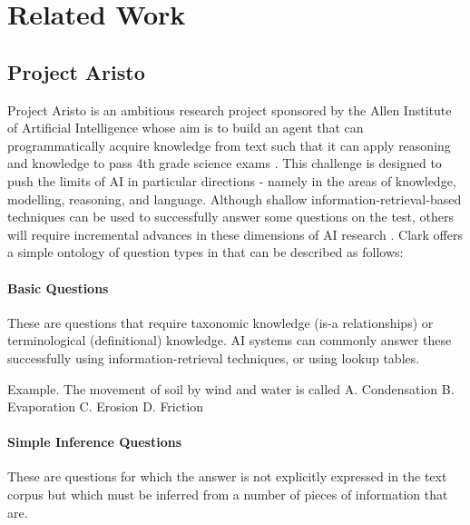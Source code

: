  
\chapter{Related Work}

\section{Project Aristo}

Project Aristo is an ambitious research project sponsored by the Allen Institute of
Artificial Intelligence whose aim is to build an agent that can programmatically 
acquire knowledge from text such that it can apply reasoning and knowledge 
to pass 4th grade science exams \cite{clark2015elementary}.  This challenge is designed to push the limits of AI in particular directions - namely in the areas of knowledge, modelling, reasoning, and language.  Although shallow information-retrieval-based techniques can be used to successfully answer some questions on the test, others will require incremental advances in these dimensions of AI research \cite{clark2015elementary}.  Clark \cite{clark2015elementary} offers a simple ontology of question types in that can be described as follows:


\subsubsection{Basic Questions}

These are questions that require taxonomic knowledge (is-a relationships) or terminological (definitional) knowledge.  AI systems can commonly answer these successfully using information-retrieval techniques, or using lookup tables.  


Example. The movement of soil by wind and water is called A. Condensation B. Evaporation C. Erosion D. Friction \cite{clark2015elementary}

\subsubsection{Simple Inference Questions}
These are questions for which the answer is not explicitly expressed in the text corpus but which must be inferred from a number of pieces of information that are.

